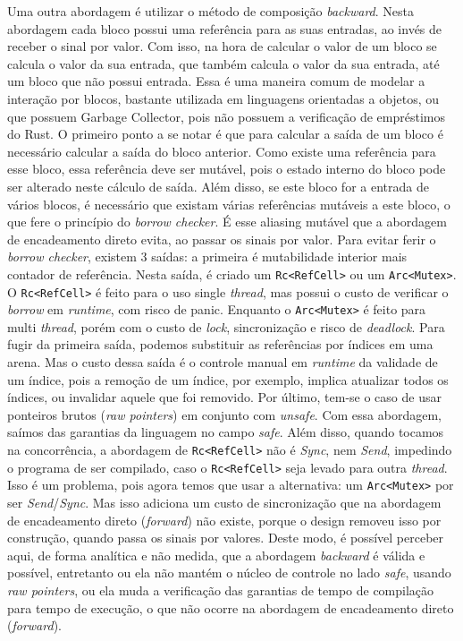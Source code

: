 Uma outra abordagem é utilizar o método de composição \textit{backward}. Nesta abordagem cada bloco possui uma referência para as suas entradas, ao invés de receber o sinal por valor. Com isso, na hora de calcular o valor de um bloco se calcula o valor da sua entrada, que também calcula o valor da sua entrada, até um bloco que não possui entrada. Essa é uma maneira comum de modelar a interação por blocos, bastante utilizada em linguagens orientadas a objetos, ou que possuem Garbage Collector, pois não possuem a verificação de empréstimos do Rust. O primeiro ponto a se notar é que para calcular a saída de um bloco é necessário calcular a saída do bloco anterior. Como existe uma referência para esse bloco, essa referência deve ser mutável, pois o estado interno do bloco pode ser alterado neste cálculo de saída. Além disso, se este bloco for a entrada de vários blocos, é necessário que existam várias referências mutáveis a este bloco, o que fere o princípio do \textit{borrow checker}. É esse aliasing mutável que a abordagem de encadeamento direto evita, ao passar os sinais por valor. Para evitar ferir o \textit{borrow checker}, existem 3 saídas: a primeira é mutabilidade interior mais contador de referência. Nesta saída, é criado um \texttt{Rc<RefCell>} ou um \texttt{Arc<Mutex>}. O \texttt{Rc<RefCell>} é feito para o uso single \textit{thread}, mas possui o custo de verificar o \textit{borrow} em \textit{runtime}, com risco de panic. Enquanto o \texttt{Arc<Mutex>} é feito para multi \textit{thread}, porém com o custo de \textit{lock}, sincronização e risco de \textit{deadlock}. Para fugir da primeira saída, podemos substituir as referências por índices em uma arena. Mas o custo dessa saída é o controle manual em \textit{runtime} da validade de um índice, pois a remoção de um índice, por exemplo, implica atualizar todos os índices, ou invalidar aquele que foi removido. Por último, tem-se o caso de usar ponteiros brutos (\textit{raw pointers}) em conjunto com \textit{unsafe}. Com essa abordagem, saímos das garantias da linguagem no campo \textit{safe}. Além disso, quando tocamos na concorrência, a abordagem de \texttt{Rc<RefCell>} não é \textit{Sync}, nem \textit{Send}, impedindo o programa de ser compilado, caso o \texttt{Rc<RefCell>} seja levado para outra \textit{thread}. Isso é um problema, pois agora temos que usar a alternativa: um \texttt{Arc<Mutex>} por ser \textit{Send}/\textit{Sync}. Mas isso adiciona um custo de sincronização que na abordagem de encadeamento direto (\textit{forward}) não existe, porque o design removeu isso por construção, quando passa os sinais por valores. Deste modo, é possível perceber aqui, de forma analítica e não medida, que a abordagem \textit{backward} é válida e possível, entretanto ou ela não mantém o núcleo de controle no lado \textit{safe}, usando \textit{raw pointers}, ou ela muda a verificação das garantias de tempo de compilação para tempo de execução, o que não ocorre na abordagem de encadeamento direto (\textit{forward}).


